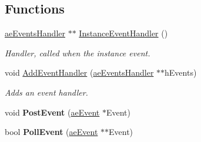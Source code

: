 \subsection*{Functions}
\begin{DoxyCompactItemize}
\item 
\hyperlink{structae_core_1_1ae_events_handler}{ae\+Events\+Handler} $\ast$$\ast$ \hyperlink{namespaceae_core_a9e9fe1f81e3dae61e2ff05577c56efcc}{Instance\+Event\+Handler} ()
\begin{DoxyCompactList}\small\item\em Handler, called when the instance event. \end{DoxyCompactList}\item 
void \hyperlink{namespaceae_core_a6342a6d2d6b48fd24dd6c20abe1e74dc}{Add\+Event\+Handler} (\hyperlink{structae_core_1_1ae_events_handler}{ae\+Events\+Handler} $\ast$$\ast$h\+Events)
\begin{DoxyCompactList}\small\item\em Adds an event handler. \end{DoxyCompactList}\item 
void {\bfseries Post\+Event} (\hyperlink{structae_core_1_1ae_event}{ae\+Event} $\ast$Event)\hypertarget{namespaceae_core_a690308c1af308f182d61df5eb5da3acd}{}\label{namespaceae_core_a690308c1af308f182d61df5eb5da3acd}

\item 
bool {\bfseries Poll\+Event} (\hyperlink{structae_core_1_1ae_event}{ae\+Event} $\ast$$\ast$Event)\hypertarget{namespaceae_core_ae995089003a7f4a674cfff58deb5b928}{}\label{namespaceae_core_ae995089003a7f4a674cfff58deb5b928}


\end{DoxyCompactItemize}
